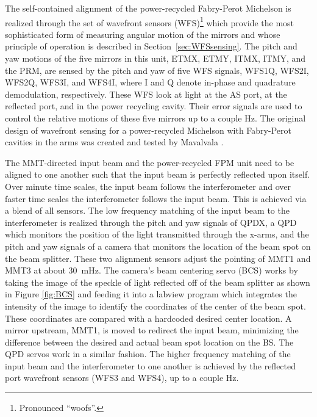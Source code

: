 The self-contained alignment of the power-recycled Fabry-Perot Michelson is realized through the set of wavefront sensors (WFS)\footnote{Pronounced ``woofs''.} which provide the most sophisticated form of measuring angular motion of the mirrors and whose principle of operation is described in Section~\ref{sec:WFSsensing}.  The pitch and yaw motions of the five mirrors in this unit, ETMX, ETMY, ITMX, ITMY, and the PRM, are sensed by the pitch and yaw of five WFS signals, WFS1Q, WFS2I, WFS2Q, WFS3I, and WFS4I, where I and Q denote in-phase and quadrature demodulation, respectively. These WFS look at light at the AS port, at the reflected port, and in the power recycling cavity. Their error signals are used to control the relative motions of these five mirrors up to a couple Hz. The original design of wavefront sensing for a power-recycled Michelson with Fabry-Perot cavities in the arms was created and tested by Mavalvala \cite{Mavalvala1998Experimental, Mavalvala1997Alignment}.

The MMT-directed input beam and the power-recycled FPM unit need to be aligned to one another such that the input beam is perfectly reflected upon itself. Over minute time scales, the input beam follows the interferometer and over faster time scales the interferometer follows the input beam. This is achieved via a blend of all sensors. The low frequency matching of the input beam to the interferometer is realized through the pitch and yaw signals of QPDX, a QPD which monitors the position of the light transmitted through the x-arms, and the pitch and yaw signals of a camera that monitors the location of the beam spot on the beam splitter. These two alignment sensors adjust the pointing of MMT1 and MMT3 at about 30~mHz. The camera's beam centering servo (BCS) works by taking the image of the speckle of light reflected off of the beam splitter as shown in Figure \ref{fig:BCS} and feeding it into a labview program which integrates the intensity of the image to identify the coordinates of the center of the beam spot. These coordinates are compared with a hardcoded desired center location. A mirror upstream, MMT1, is moved to redirect the input beam, minimizing the difference between the desired and actual beam spot location on the BS. The QPD servos work in a similar fashion. The higher frequency matching of the input beam and the interferometer to one another is achieved by the reflected port wavefront sensors (WFS3 and WFS4), up to a couple Hz.

